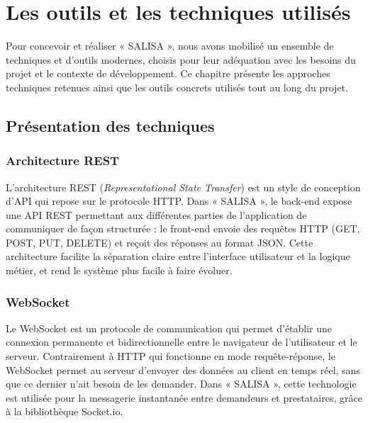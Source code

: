 \chapter{Les outils et les techniques utilisés}
\pagestyle{styleGlobal}
\label{chap:outils}

Pour concevoir et réaliser « SALISA », nous avons mobilisé un ensemble de techniques et d'outils modernes, choisis pour leur adéquation avec les besoins du projet et le contexte de développement. Ce chapitre présente les approches techniques retenues ainsi que les outils concrets utilisés tout au long du projet.

\section{Présentation des techniques}

\subsection*{\textcolor{vertCongo}{Architecture REST}}

L'architecture REST (\textit{Representational State Transfer}) est un style de conception d'API qui repose sur le protocole HTTP. Dans « SALISA », le back-end expose une API REST permettant aux différentes parties de l'application de communiquer de façon structurée : le front-end envoie des requêtes HTTP (GET, POST, PUT, DELETE) et reçoit des réponses au format JSON. Cette architecture facilite la séparation claire entre l'interface utilisateur et la logique métier, et rend le système plus facile à faire évoluer.

\subsection*{\textcolor{vertCongo}{WebSocket}}

Le WebSocket est un protocole de communication qui permet d'établir une connexion permanente et bidirectionnelle entre le navigateur de l'utilisateur et le serveur. Contrairement à HTTP qui fonctionne en mode requête-réponse, le WebSocket permet au serveur d'envoyer des données au client en temps réel, sans que ce dernier n'ait besoin de les demander. Dans « SALISA », cette technologie est utilisée pour la messagerie instantanée entre demandeurs et prestataires, grâce à la bibliothèque Socket.io.

